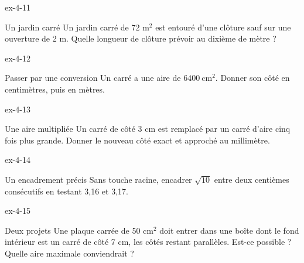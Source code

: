 \begin{blocLivre}{ex-4-11}\begin{exercice}[3]{Un jardin carré}
Un jardin carré de 72 m$^2$ est entouré d’une clôture sauf sur une ouverture de 2 m. Quelle longueur de clôture prévoir au dixième de mètre ?
\label{fig-ex-4-11}
\end{exercice}\end{blocLivre}
\begin{blocLivre}{ex-4-12}\begin{exercice}[3]{Passer par une conversion}
Un carré a une aire de $6400\ \mathrm{cm}^2$. Donner son côté en centimètres, puis en mètres.
\end{exercice}\end{blocLivre}
\begin{blocLivre}{ex-4-13}\begin{exercice}[3]{Une aire multipliée}
Un carré de côté 3 cm est remplacé par un carré d’aire cinq fois plus grande. Donner le nouveau côté exact et approché au millimètre.
\label{fig-ex-4-13}
\end{exercice}\end{blocLivre}
\begin{blocLivre}{ex-4-14}\begin{exercice}[3]{Un encadrement précis}
Sans touche racine, encadrer $\sqrt{10}$ entre deux centièmes consécutifs en testant 3,16 et 3,17.
\end{exercice}\end{blocLivre}
\begin{blocLivre}{ex-4-15}\begin{exercice}[3]{Deux projets}
Une plaque carrée de 50 cm$^2$ doit entrer dans une boîte dont le fond intérieur est un carré de côté 7 cm, les côtés restant parallèles. Est-ce possible ? Quelle aire maximale conviendrait ?
\label{fig-ex-4-15}
\end{exercice}\end{blocLivre}

\clearpage
